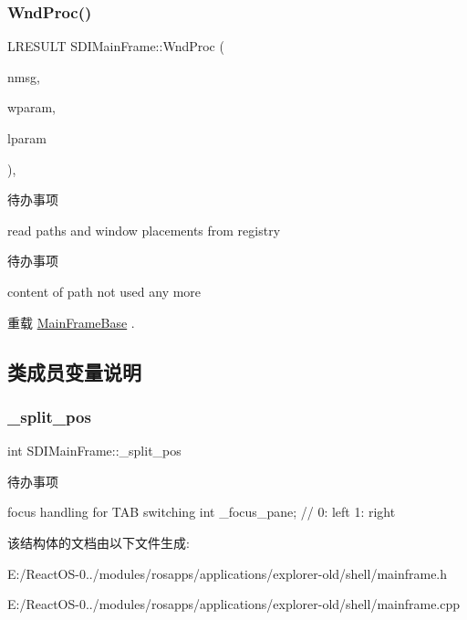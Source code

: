\subsubsection{\texorpdfstring{Wnd\+Proc()}{WndProc()}}
{\footnotesize\ttfamily L\+R\+E\+S\+U\+LT S\+D\+I\+Main\+Frame\+::\+Wnd\+Proc (\begin{DoxyParamCaption}\item[{U\+I\+NT}]{nmsg,  }\item[{W\+P\+A\+R\+AM}]{wparam,  }\item[{L\+P\+A\+R\+AM}]{lparam }\end{DoxyParamCaption})\hspace{0.3cm}{\ttfamily [protected]}, {\ttfamily [virtual]}}

\begin{DoxyRefDesc}{待办事项}
\item[\hyperlink{todo__todo000039}{待办事项}]read paths and window placements from registry \end{DoxyRefDesc}


\begin{DoxyRefDesc}{待办事项}
\item[\hyperlink{todo__todo000040}{待办事项}]content of \textquotesingle{}path\textquotesingle{} not used any more \end{DoxyRefDesc}


重载 \hyperlink{struct_main_frame_base}{Main\+Frame\+Base} .



\subsection{类成员变量说明}
\mbox{\label{struct_s_d_i_main_frame_ab5627e9d93b8557c6ead9de6a98c845b}} 
\subsubsection{\texorpdfstring{\+\_\+split\+\_\+pos}{\_split\_pos}}
{\footnotesize\ttfamily int S\+D\+I\+Main\+Frame\+::\+\_\+split\+\_\+pos\hspace{0.3cm}{\ttfamily [protected]}}

\begin{DoxyRefDesc}{待办事项}
\item[\hyperlink{todo__todo000041}{待办事项}]focus handling for T\+AB switching int \+\_\+focus\+\_\+pane; // 0\+: left 1\+: right \end{DoxyRefDesc}


该结构体的文档由以下文件生成\+:\begin{DoxyCompactItemize}
\item 
E\+:/\+React\+O\+S-\/0../modules/rosapps/applications/explorer-\/old/shell/mainframe.\+h\item 
E\+:/\+React\+O\+S-\/0../modules/rosapps/applications/explorer-\/old/shell/mainframe.\+cpp\end{DoxyCompactItemize}
